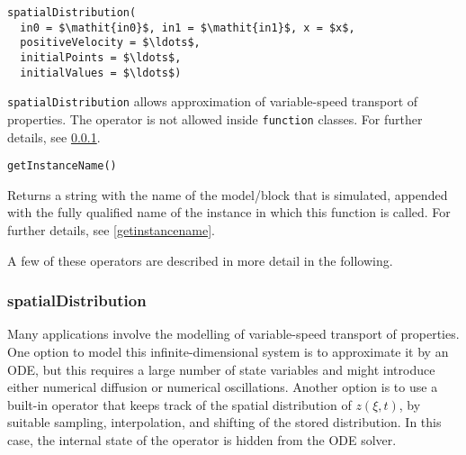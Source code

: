 \begin{operatordefinition}[spatialDistribution]
\begin{synopsis}\begin{lstlisting}
spatialDistribution(
  in0 = $\mathit{in0}$, in1 = $\mathit{in1}$, x = $x$,
  positiveVelocity = $\ldots$,
  initialPoints = $\ldots$,
  initialValues = $\ldots$)
\end{lstlisting}\end{synopsis}
\begin{semantics}
\lstinline!spatialDistribution! allows approximation of variable-speed transport of properties.
The operator is not allowed inside \lstinline!function! classes.
For further details, see \cref{spatialdistribution}.
\end{semantics}
\end{operatordefinition}

\begin{operatordefinition}[getInstanceName]
\begin{synopsis}\begin{lstlisting}
getInstanceName()
\end{lstlisting}\end{synopsis}
\begin{semantics}
Returns a string with the name of the model/block that is simulated, appended with the fully qualified name of the instance in which this function is called.
For further details, see \cref{getinstancename}.
\end{semantics}
\end{operatordefinition}

A few of these operators are described in more detail in the following.

\subsubsection{spatialDistribution}\label{spatialdistribution}

\begin{nonnormative}
Many applications involve the modelling of variable-speed transport of properties.
One option to model this infinite-dimensional system is to approximate it by an ODE, but this requires a large number of state variables and might introduce either numerical diffusion or numerical oscillations.
Another option is to use a built-in operator that keeps track of the spatial distribution of $z(\xi, t)$, by suitable sampling, interpolation, and shifting of the stored distribution.
In this case, the internal state of the operator is hidden from the ODE solver.
\end{nonnormative}

